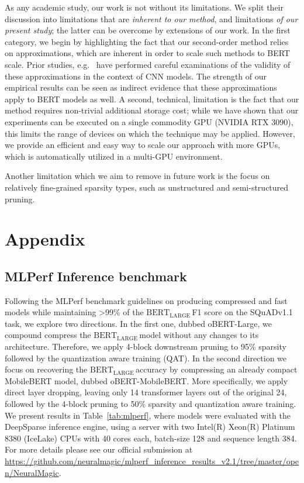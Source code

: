 \documentclass[11pt]{article}
\newcommand{\bertL}{$\textrm{BERT}_{\textrm{LARGE}}\,$}
\begin{document}
As any academic study, our work is not without its limitations. 
We split their discussion into limitations that are  \emph{inherent to our method}, and limitations \emph{of our present study}; the latter can be overcome by extensions of our work.
In the first category, we begin by highlighting the fact that our second-order method relies on approximations, which are inherent in order to scale such methods to BERT scale. 
Prior studies, e.g.~\cite{Singh2020WoodFisherES} have performed careful examinations of the validity of these approximations in the context of CNN models. 
The strength of our empirical results can be seen as indirect evidence that these approximations apply to BERT models as well. 
A second, technical, limitation is the fact that our method requires non-trivial additional storage cost; while we have shown that our experiments can be executed on a single commodity GPU (NVIDIA RTX 3090), this limits the range of devices on which the technique may be applied. However, we provide an efficient and easy way to scale our approach with more GPUs, which is automatically utilized in a multi-GPU environment.  

Another limitation which we aim to remove in future work is the focus on relatively fine-grained sparsity types, such as unstructured and semi-structured pruning. 






\appendix
\section{Appendix}
\label{sec:appendix}

\subsection{MLPerf Inference benchmark}
\label{app:mlperf}
Following the MLPerf benchmark guidelines on producing compressed and fast models while maintaining >99\% of the \bertL F1 score on the SQuADv1.1 task, we explore two directions. In the first one, dubbed oBERT-Large, we compound compress the \bertL model without any changes to its architecture. Therefore, we apply 4-block downstream pruning to 95\% sparsity followed by the quantization aware training (QAT). In the second direction we focus on recovering the \bertL accuracy by compressing an already compact MobileBERT model, dubbed oBERT-MobileBERT. More specifically, we apply direct layer dropping, leaving only 14 transformer layers out of the original 24, followed by the 4-block pruning to 50\% sparsity and quantization aware training. We present results in Table~\ref{tab:mlperf}, where models were evaluated with the DeepSparse inference engine, using a server with two Intel(R) Xeon(R) Platinum 8380 (IceLake) CPUs with 40 cores each, batch-size 128 and sequence length 384. For more details please see our official submission at \url{https://github.com/neuralmagic/mlperf_inference_results_v2.1/tree/master/open/NeuralMagic}.
\end{document}
